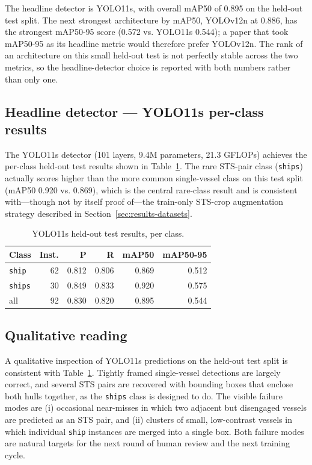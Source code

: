 \documentclass[10pt, letterpaper, twocolumn]{article}
\begin{document}
The headline detector is YOLO11s, with overall mAP50 of 0.895 on the held-out test split. The next strongest architecture by mAP50, YOLOv12n at 0.886, has the strongest mAP50-95 score (0.572 vs. YOLO11s 0.544); a paper that took mAP50-95 as its headline metric would therefore prefer YOLOv12n. The rank of an architecture on this small held-out test is not perfectly stable across the two metrics, so the headline-detector choice is reported with both numbers rather than only one.

\subsection{Headline detector --- YOLO11s per-class results}

The YOLO11s detector (101 layers, 9.4M parameters, 21.3 GFLOPs) achieves the per-class held-out test results shown in Table~\ref{tab:yolo11s-perclass}. The rare STS-pair class (\texttt{ships}) actually scores higher than the more common single-vessel class on this test split (mAP50 0.920 vs. 0.869), which is the central rare-class result and is consistent with---though not by itself proof of---the train-only STS-crop augmentation strategy described in Section~\ref{sec:results-datasets}.

\begin{table}[h]
\caption{YOLO11s held-out test results, per class.}
\label{tab:yolo11s-perclass}
\begin{tabular}{lrrrrr}
\toprule
\textbf{Class} & \textbf{Inst.} & \textbf{P} & \textbf{R} & \textbf{mAP50} & \textbf{mAP50-95} \\
\midrule
\texttt{ship}  & 62 & 0.812 & 0.806 & 0.869 & 0.512 \\
\texttt{ships} & 30 & 0.849 & 0.833 & 0.920 & 0.575 \\
\midrule
all            & 92 & 0.830 & 0.820 & 0.895 & 0.544 \\
\bottomrule
\end{tabular}
\end{table}

\subsection{Qualitative reading}
\label{sec:results-qualitative}

A qualitative inspection of YOLO11s predictions on the held-out test split is consistent with Table~\ref{tab:yolo11s-perclass}. Tightly framed single-vessel detections are largely correct, and several STS pairs are recovered with bounding boxes that enclose both hulls together, as the \texttt{ships} class is designed to do. The visible failure modes are (i) occasional near-misses in which two adjacent but disengaged vessels are predicted as an STS pair, and (ii) clusters of small, low-contrast vessels in which individual \texttt{ship} instances are merged into a single box. Both failure modes are natural targets for the next round of human review and the next training cycle.
\end{document}
